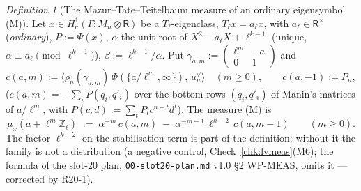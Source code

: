 \documentclass[11pt]{article}
\theoremstyle{remark}
\newtheorem{definition}[theorem]{Definition}
\newcommand{\Z}{\mathbb{Z}}
\newcommand{\Ga}{\Gamma}
\newcommand{\Mn}{M_n}
\begin{document}
\begin{definition}[The Mazur--Tate--Teitelbaum measure of an ordinary eigensymbol (M)]\label{def:lvmtt}
Let $x\in H^{1}_c(\Ga;\Mn\otimes\mathsf R)$ be a $T_\ell$-eigenclass, $T_\ell x=a_\ell x$, with $a_\ell\in\mathsf R^{\times}$ (\emph{ordinary}), $P:=\Psi(x)$, $\alpha$ the unit root
of $X^{2}-a_\ell X+\ell^{k-1}$ (unique, $\alpha\equiv a_\ell\pmod{\ell^{k-1}}$), $\beta:=\ell^{k-1}/\alpha$. Put $\gamma_{a,m}:=\begin{pmatrix}\ell^{m}&-a\\0&1\end{pmatrix}$ and
\[
  c(a,m):=\bigl\langle\rho_n(\gamma_{a,m})\,\Phi(\{a/\ell^{m},\infty\}),\,u_n^{\vee}\bigr\rangle\quad(m\ge0),\qquad c(a,-1):=P_n,
\]
($c(a,m)=-\sum_iP(q_i,q'_i)$ over the bottom rows $(q_i,q'_i)$ of Manin's matrices of $a/\ell^{m}$, with $P(c,d):=\sum_tP_tc^{n-t}d^{t}$). The measure (M) is
\[
  \mu_x(a+\ell^{m}\Z_\ell)\;:=\;\alpha^{-m}\,c(a,m)\;-\;\alpha^{-m-1}\,\ell^{k-2}\,c(a,m-1)\qquad(m\ge0).
\]
The factor $\ell^{k-2}$ on the stabilisation term is part of the definition: without it the family is not a distribution (a negative control,
Check~\ref{chk:lvmeas}(M6); the formula of the slot-20 plan, \texttt{00-slot20-plan.md} v1.0 \S2 WP-MEAS, omits it --- corrected by R20-1).
\end{definition}
\end{document}
